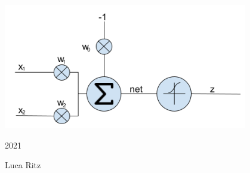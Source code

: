 \begin{titlepage}

	\vfill %


	\begin{center}
	\includegraphics[width=0.8\textwidth]{../common/resources/00_perceptron.png}
	\end{center}

	\vspace{0.3\baselineskip} %

	2021 %

	{\large Luca Ritz} %

\end{titlepage}
